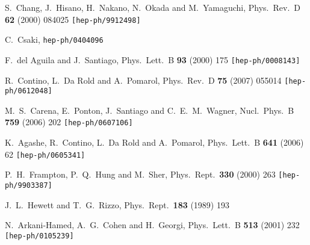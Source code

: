 \documentclass[12pt,a4paper]{article}
\begin{document}
\begin{thebibliography}{99}
  S.~Chang, J.~Hisano, H.~Nakano, N.~Okada and M.~Yamaguchi,
  Phys.\ Rev.\  D {\bf 62} (2000) 084025
  {\tt [hep-ph/9912498]}

  C.~Csaki,
  {\tt hep-ph/0404096}

  F.~del Aguila and J.~Santiago,
  Phys.\ Lett.\  B {\bf 93} (2000) 175
  {\tt [hep-ph/0008143]}


  R.~Contino, L.~Da Rold and A.~Pomarol,
  Phys.\ Rev.\  D {\bf 75} (2007) 055014
  {\tt [hep-ph/0612048]}

  M.~S.~Carena, E.~Ponton, J.~Santiago and C.~E.~M.~Wagner,
  Nucl.\ Phys.\  B {\bf 759} (2006) 202
  {\tt [hep-ph/0607106]}

  K.~Agashe, R.~Contino, L.~Da Rold and A.~Pomarol,
  Phys.\ Lett.\  B {\bf 641} (2006) 62
  {\tt [hep-ph/0605341]}


  P.~H.~Frampton, P.~Q.~Hung and M.~Sher,
  Phys.\ Rept.\  {\bf 330} (2000) 263
  {\tt [hep-ph/9903387]}

  J.~L.~Hewett and T.~G.~Rizzo,
  Phys.\ Rept.\  {\bf 183} (1989) 193


  N.~Arkani-Hamed, A.~G.~Cohen and H.~Georgi,
  Phys.\ Lett.\  B {\bf 513} (2001) 232
  {\tt [hep-ph/0105239]}


\end{thebibliography}
\end{document}
